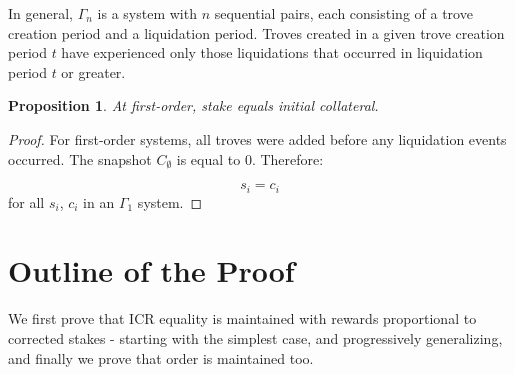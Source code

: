 \documentclass[reqno]{article}
\newtheorem{proposition}[theorem]{Proposition}
\begin{document}
In general, $\Gamma_n$ is a system with $n$ sequential pairs, each consisting of a trove creation period and a liquidation period. Troves created in a given trove creation period $t$ have experienced only those liquidations that occurred in liquidation period $t$ or greater.

\begin{proposition}
  At first-order, stake equals initial collateral.
\end{proposition}
\begin{proof}
For first-order systems, all troves were added before any liquidation events occurred. The snapshot $C_\emptyset$ is equal to 0. Therefore:

\begin{equation}
    s_i=c_i
\end{equation}
for all $s_i$, $c_i$ in an $\Gamma_1$ system.
\end{proof}

\section{Outline of the Proof}

We first prove that ICR equality is maintained with rewards proportional to corrected stakes - starting with the simplest case, and progressively generalizing, and finally we prove that order is maintained too.
\end{document}
